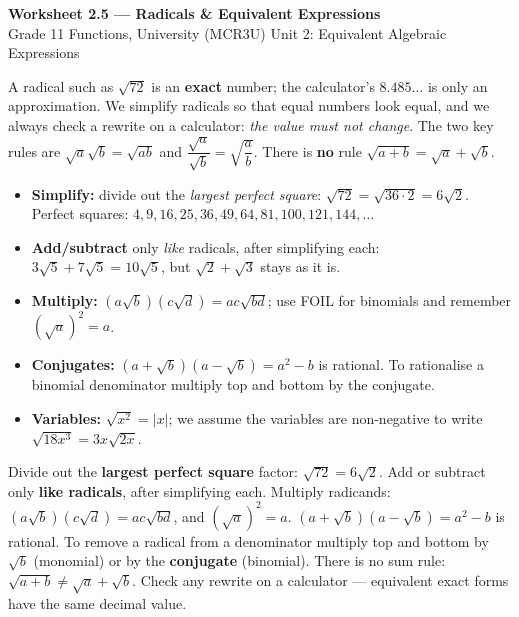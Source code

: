 \documentclass[11pt]{article}
\begin{document}
\begin{center}
{\LARGE\bfseries\color{titleblue}Worksheet 2.5 --- Radicals \& Equivalent Expressions}\\[2pt]
{\small Grade 11 Functions, University (MCR3U) \textperiodcentered{} Unit 2: Equivalent Algebraic Expressions}
\end{center}

\begin{ideabox}
A radical such as $\sqrt{72}$ is an \textbf{exact} number; the calculator's $8.485\ldots$ is only an approximation. We simplify radicals so that equal numbers look equal, and we always check a rewrite on a calculator: \emph{the value must not change}. The two key rules are $\sqrt a\sqrt b=\sqrt{ab}$ and $\dfrac{\sqrt a}{\sqrt b}=\sqrt{\dfrac ab}$. There is \textbf{no} rule $\sqrt{a+b}=\sqrt a+\sqrt b$.
\begin{itemize}[leftmargin=*,itemsep=2pt]
  \item \textbf{Simplify:} divide out the \emph{largest perfect square}: $\sqrt{72}=\sqrt{36\cdot2}=6\sqrt2$. Perfect squares: $4,9,16,25,36,49,64,81,100,121,144,\ldots$
  \item \textbf{Add/subtract} only \emph{like} radicals, after simplifying each: $3\sqrt5+7\sqrt5=10\sqrt5$, but $\sqrt2+\sqrt3$ stays as it is.
  \item \textbf{Multiply:} $(a\sqrt b)(c\sqrt d)=ac\sqrt{bd}$; use FOIL for binomials and remember $(\sqrt a)^2=a$.
  \item \textbf{Conjugates:} $(a+\sqrt b)(a-\sqrt b)=a^2-b$ is rational. To rationalise a binomial denominator multiply top and bottom by the conjugate.
  \item \textbf{Variables:} $\sqrt{x^2}=|x|$; we assume the variables are non-negative to write $\sqrt{18x^3}=3x\sqrt{2x}$.
\end{itemize}
\end{ideabox}

\begin{learnbox}
Divide out the \textbf{largest perfect square} factor: $\sqrt{72}=6\sqrt2$. Add or subtract only \textbf{like radicals}, after simplifying each. Multiply radicands: $(a\sqrt b)(c\sqrt d)=ac\sqrt{bd}$, and $(\sqrt a)^2=a$.
$(a+\sqrt b)(a-\sqrt b)=a^2-b$ is rational. To remove a radical from a denominator multiply top and bottom by $\sqrt b$ (monomial) or by the \textbf{conjugate} (binomial).
There is no sum rule: $\sqrt{a+b}\ne\sqrt a+\sqrt b$. Check any rewrite on a calculator --- equivalent exact forms have the same decimal value.
\end{learnbox}
\end{document}
